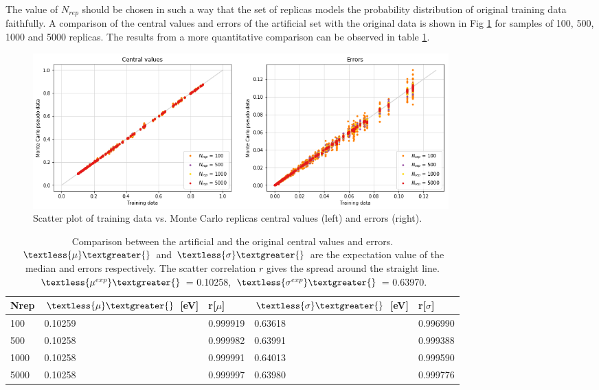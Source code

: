The value of $N_{rep}$ should be chosen in such a way that the set of replicas models the probability distribution of original training data faithfully. A comparison of the central values and errors of the artificial set with the original data is shown in Fig \ref{mcvacuum} for samples of 100, 500, 1000 and 5000 replicas. The results from a more quantitative comparison can be observed in table \ref{tablemcvacuum}.

\begin{figure}[H]
    \centering 
    \includegraphics[width=160mm]{plots/Montecarlovacuum.png}
    \caption{Scatter plot of training data vs. Monte Carlo replicas central values (left) and errors (right). }
    \label{mcvacuum}
\end{figure}
\begin{table}[H]
\centering
\begin{tabular}{|l|ll|ll|}
\hline
Nrep & $\textless{\mu}\textgreater{}$ {[}eV{]} & r{[}$\mu${]} & $\textless{\sigma}\textgreater{}$ {[}eV{]} & r{[}$\sigma${]} \\ \hline
100  & 0.10259                           & 0.999919   & 0.63618                                  & 0.996990      \\ \hline
500  & 0.10258                              & 0.999982   & 0.63991                                  & 0.999388      \\ \hline
1000 & 0.10258                              & 0.999991   & 0.64013                                  & 0.999590      \\ \hline
5000 & 0.10258                              & 0.999997   & 0.63980                                  & 0.999776      \\ \hline
\end{tabular}
\caption{Comparison between the artificial and the original central values and errors. $\textless{\mu}\textgreater{}$ and $\textless{\sigma}\textgreater{}$ are the expectation value of the median and errors respectively. The scatter correlation $r$ gives the spread around the straight line. $\textless{\mu^{exp}}\textgreater{}$ = 0.10258, $\textless{\sigma^{exp}}\textgreater{}$ = 0.63970. }
\label{tablemcvacuum}
\end{table}



